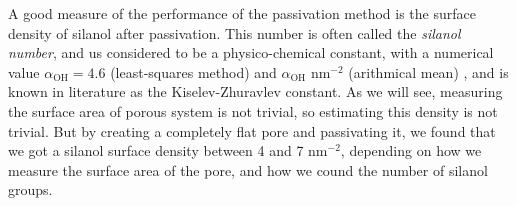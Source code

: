 A good measure of the performance of the passivation method is the surface density of silanol after passivation. This number is often called the \emph{silanol number}, and us considered to be a physico-chemical constant, with a numerical value $\alpha_\text{OH} = 4.6$ (least-squares method) and $\alpha_\text{OH}\text{ nm}^{-2}$ (arithmical mean) \cite{zhuravlev1999silanol}, and is known in literature as the Kiselev-Zhuravlev constant. As we will see, measuring the surface area of porous system is not trivial, so estimating this density is not trivial. But by creating a completely flat pore and passivating it, we found that we got a silanol surface density between 4 and 7 nm$^{-2}$, depending on how we measure the surface area of the pore, and how we cound the number of silanol groups. %



